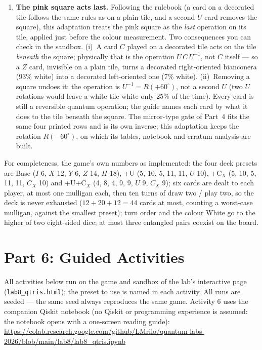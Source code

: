 \documentclass[a4paper,11pt]{article}
\begin{document}
\begin{enumerate}
          the game's philosophy than serving the typo.
    \item\label{dev:pink} \textbf{The pink square acts last.} Following the rulebook (a card on a
          decorated tile follows the same rules as on a plain tile, and a second $U$ card removes the
          square), this adaptation treats the pink square as the \emph{last} operation on its tile,
          applied just before the colour measurement. Two consequences you can check in the sandbox.
          (i)~A card $C$ played on a decorated tile acts on the tile \emph{beneath} the square;
          physically that is the operation $U\,C\,U^{-1}$, not $C$ itself --- so a $Z$ card, invisible
          on a plain tile, turns a decorated right-oriented bianconera (93\% white) into a decorated
          left-oriented one (7\% white). (ii)~Removing a square undoes it: the operation is
          $U^{-1} = R(+60^\circ)$, not a second $U$ (two $U$ rotations would leave a white tile white
          only 25\% of the time). Every card is still a reversible quantum operation; the guide names
          each card by what it does to the tile beneath the square. The mirror-type gate of Part~4
          fits the same four printed rows and is its own inverse; this adaptation keeps the rotation
          $R(-60^\circ)$, on which its tables, notebook and erratum analysis are built.
\end{enumerate}

\noindent For completeness, the game's own numbers as implemented: the four deck
presets are Base ($I$ 6, $X$ 12, $Y$ 6, $Z$ 14, $H$ 18), +U (5, 10, 5, 11, 11, $U$ 10),
+C$_X$ (5, 10, 5, 11, 11, $C_X$ 10) and +U+C$_X$ (4, 8, 4, 9, 9, $U$ 9, $C_X$ 9); six
cards are dealt to each player, at most one mulligan each, then ten turns of draw two /
play two, so the deck is never exhausted ($12 + 20 + 12 = 44$ cards at most, counting a
worst-case mulligan, against the smallest preset); turn order and the colour White go to
the higher of two eight-sided dice; at most three entangled pairs coexist on the board.

\newpage

\section{Part 6: Guided Activities}

\begin{simulatorbox}
All activities below run on the game and sandbox of the lab's interactive page
(\texttt{lab8\_qtris.html}); the preset to use is named in each activity. All runs
are seeded --- the same seed always reproduces the same game. Activity 6 uses the
companion Qiskit notebook (no Qiskit or programming experience is assumed: the notebook
opens with a one-screen reading guide):\\[4pt]
\url{https://colab.research.google.com/github/LMrilo/quantum-labs-2026/blob/main/lab8/lab8_qtris.ipynb}
\end{simulatorbox}
\end{document}
